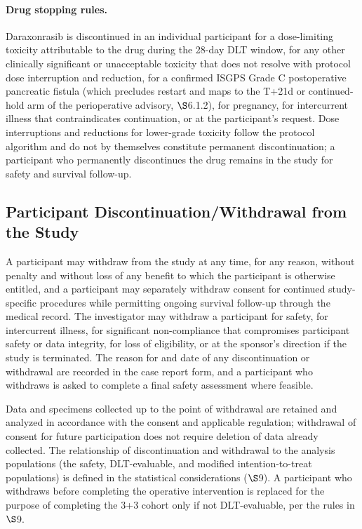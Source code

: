 \paragraph{Drug stopping rules.}
Daraxonrasib is discontinued in an individual participant for a dose-limiting
toxicity attributable to the drug during the 28-day DLT window, for any other
clinically significant or unacceptable toxicity that does not resolve with protocol
dose interruption and reduction, for a confirmed ISGPS Grade C postoperative
pancreatic fistula \cite{Bassi2017} (which precludes restart and maps to the T+21d
or continued-hold arm of the perioperative advisory, $\S$6.1.2), for pregnancy, for
intercurrent illness that contraindicates continuation, or at the participant's
request. Dose interruptions and reductions for lower-grade toxicity follow the
protocol algorithm and do not by themselves constitute permanent discontinuation;
a participant who permanently discontinues the drug remains in the study for safety
and survival follow-up.

\subsection{Participant Discontinuation/Withdrawal from the Study}

A participant may withdraw from the study at any time, for any reason, without
penalty and without loss of any benefit to which the participant is otherwise
entitled, and a participant may separately withdraw consent for continued
study-specific procedures while permitting ongoing survival follow-up through the
medical record. The investigator may withdraw a participant for safety, for
intercurrent illness, for significant non-compliance that compromises participant
safety or data integrity, for loss of eligibility, or at the sponsor's direction if
the study is terminated. The reason for and date of any discontinuation or
withdrawal are recorded in the case report form, and a participant who withdraws is
asked to complete a final safety assessment where feasible.

Data and specimens collected up to the point of withdrawal are retained and analyzed
in accordance with the consent and applicable regulation; withdrawal of consent for
future participation does not require deletion of data already collected. The
relationship of discontinuation and withdrawal to the analysis populations (the
safety, DLT-evaluable, and modified intention-to-treat populations) is defined in
the statistical considerations ($\S$9). A participant who withdraws before
completing the operative intervention is replaced for the purpose of completing the
3+3 cohort only if not DLT-evaluable, per the rules in $\S$9.

